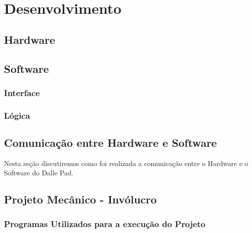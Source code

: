 
\chapter{Desenvolvimento}
\label{chap:desenvolvimento}



    \section{Hardware}



    \section{Software}



        \subsection{Interface}



        \subsection{Lógica}



    \section{Comunicação entre Hardware e Software}

    Nesta seção discutiremos como foi realizada a comunicação entre o Hardware e o Software do Dalle Pad.
    
    

    \section{Projeto Mecânico - Invólucro}



        \subsection{Programas Utilizados para a execução do Projeto}


